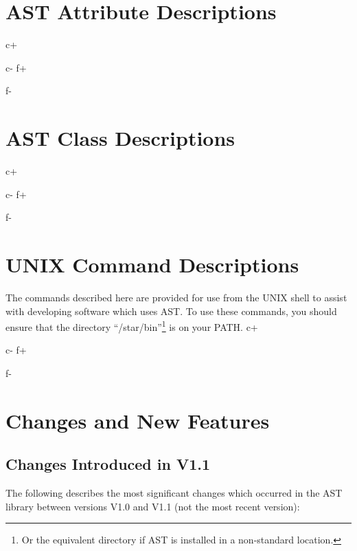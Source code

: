 \documentclass[twoside,11pt]{article}
\newcommand{\xlabel}[1]{}
\begin{document}
\cleardoublepage
\section{\label{ss:attributedescriptions}AST Attribute Descriptions}
\small
c+

c-
f+

f-
\normalsize

\cleardoublepage
\section{\label{ss:classdescriptions}AST Class Descriptions}
\small
c+

c-
f+

f-
\normalsize

\cleardoublepage
\section{\label{ss:commanddescriptions}UNIX Command Descriptions}
The commands described here are provided for use from the UNIX shell
to assist with developing software which uses AST. To use these
commands, you should ensure that the directory
``/star/bin''\footnote{Or the equivalent directory if AST is installed
in a non-standard location.} is on your PATH.
\small
c+

c-
f+

f-
\normalsize

\newpage
\section{\xlabel{changes_and_new_features}\label{ss:changes}Changes and New Features}

\subsection{Changes Introduced in V1.1}

The following describes the most significant changes which occurred in
the AST library between versions V1.0 and V1.1 (not the most recent
version):
\end{document}
